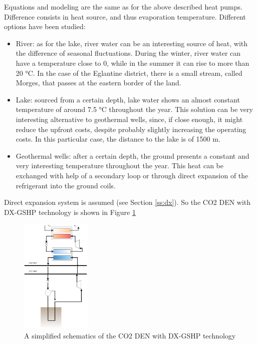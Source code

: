\documentclass{article}
\begin{document}
Equations and modeling are the same as for the above described heat pumps. Difference consists in heat source, and thus evaporation temperature. Different options have been studied:
\begin{itemize}
    \item River: as for the lake, river water can be an interesting source of heat, with the difference of seasonal fluctuations. During the winter, river water can have a temperature close to 0, while in the summer it can rise to more than 20 \si{\celsius}. In the case of the Eglantine district, there is a small stream, called Morges, that passes at the eastern border of the land.
    \item Lake: sourced from a certain depth, lake water shows an almost constant temperature of around 7.5 \si{\celsius} throughout the year. This solution can be very interesting alternative to geothermal wells, since, if close enough, it might reduce the upfront costs, despite probably slightly increasing the operating costs. In this particular case, the distance to the lake is of 1500 m.
    \item Geothermal wells: after a certain depth, the ground presents a constant and very interesting temperature throughout the year. This heat can be exchanged with help of a secondary loop or through direct expansion of the refrigerant into the ground coils.
\end{itemize}

Direct expansion system is assumed (see Section \ref{ss:dx}).
So the CO2 DEN with DX-GSHP technology is shown in Figure \ref{fig:co2_gshp}

\begin{figure}[htp]
	\centering
	\includegraphics[width=0.3\textwidth]{CO2-DX-GSHP.png}
	\caption{A simplified schematics of the CO2 DEN with DX-GSHP technology}
	\label{fig:co2_gshp}
\end{figure}
\end{document}
